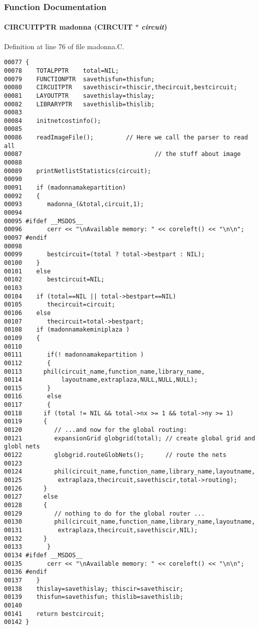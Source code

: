 \subsubsection{Function Documentation}
\label{madonna.C_a1}
\paragraph{\setlength{\rightskip}{0pt plus 5cm}CIRCUITPTR madonna (CIRCUIT $\ast$ {\em circuit})}\hfill



Definition at line 76 of file madonna.C.\small\begin{verbatim}00077 {
00078    TOTALPPTR    total=NIL;
00079    FUNCTIONPTR  savethisfun=thisfun;
00080    CIRCUITPTR   savethiscir=thiscir,thecircuit,bestcircuit;
00081    LAYOUTPTR    savethislay=thislay;
00082    LIBRARYPTR   savethislib=thislib;
00083    
00084    initnetcostinfo();
00085 
00086    readImageFile();         // Here we call the parser to read all 
00087                                     // the stuff about image
00088    
00089    printNetlistStatistics(circuit);
00090 
00091    if (madonnamakepartition)
00092    {
00093       madonna_(&total,circuit,1);
00094 
00095 #ifdef __MSDOS__
00096       cerr << "\nAvailable memory: " << coreleft() << "\n\n";
00097 #endif
00098 
00099       bestcircuit=(total ? total->bestpart : NIL);
00100    }
00101    else
00102       bestcircuit=NIL;
00103 
00104    if (total==NIL || total->bestpart==NIL)
00105       thecircuit=circuit;
00106    else
00107       thecircuit=total->bestpart;
00108    if (madonnamakeminiplaza )
00109    {
00110 
00111       if(! madonnamakepartition )
00112       {
00113      phil(circuit_name,function_name,library_name,
00114           layoutname,extraplaza,NULL,NULL,NULL);
00115       }
00116       else
00117       {
00118      if (total != NIL && total->nx >= 1 && total->ny >= 1)
00119      {
00120         // ...and now for the global routing:
00121         expansionGrid globgrid(total); // create global grid and globl nets
00122         globgrid.routeGlobNets();      // route the nets
00123 
00124         phil(circuit_name,function_name,library_name,layoutname,
00125          extraplaza,thecircuit,savethiscir,total->routing);
00126      }
00127      else
00128      {
00129         // nothing to do for the global router ...
00130         phil(circuit_name,function_name,library_name,layoutname,
00131          extraplaza,thecircuit,savethiscir,NIL);
00132      }
00133       }
00134 #ifdef __MSDOS__
00135       cerr << "\nAvailable memory: " << coreleft() << "\n\n";
00136 #endif
00137    }
00138    thislay=savethislay; thiscir=savethiscir;
00139    thisfun=savethisfun; thislib=savethislib;
00140    
00141    return bestcircuit;
00142 }
\end{verbatim}\normalsize 
\label{madonna.C_a0}
